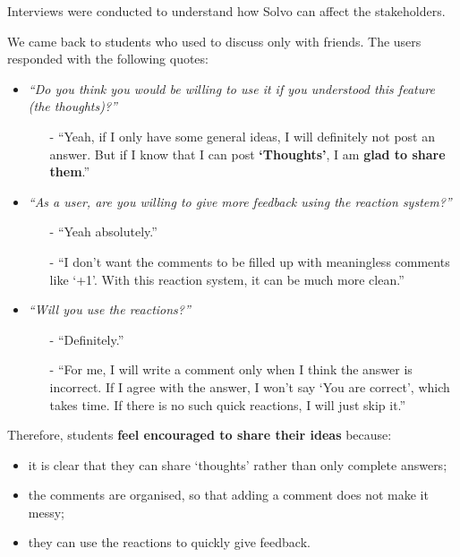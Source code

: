 \documentclass[a4paper]{article}
\begin{document}
    \noindent Interviews were conducted to understand how Solvo can affect the stakeholders.

    We came back to students who used to discuss only with friends.
    The users responded with the following quotes:
    \begin{itemize}
        \item \textit{``Do you think you would be willing to use it if you understood this feature (the thoughts)?''}
        \begin{itemize}
            \item[-] ``Yeah, if I only have some general ideas, I will definitely not post an answer.
            But if I know that I can post \textbf{`Thoughts'}, I am \textbf{glad to share them}.''
        \end{itemize}

        \item
        \textit{``As a user, are you willing to give more feedback using the reaction system?''}
        \begin{itemize}
            \item[-] ``Yeah absolutely.''
            \item[-] ``I don’t want the comments to be filled up with meaningless comments like `+1'.
            With this reaction system, it can be much more clean.''
        \end{itemize}

        \item \textit{``Will you use the reactions?''}
        \begin{itemize}
            \item[-] ``Definitely.''
            \item[-] ``For me, I will write a comment only when I think the answer is incorrect.
            If I agree with the answer, I won't say `You are correct', which takes time.
            If there is no such quick reactions, I will just skip it.''
        \end{itemize}
    \end{itemize}

    Therefore, students \textbf{feel encouraged to share their ideas} because:
    \begin{itemize}
        \item it is clear that they can share `thoughts' rather than only complete answers;
        \item the comments are organised, so that adding a comment does not make it messy;
        \item they can use the reactions to quickly give feedback.
    \end{itemize}
\end{document}
